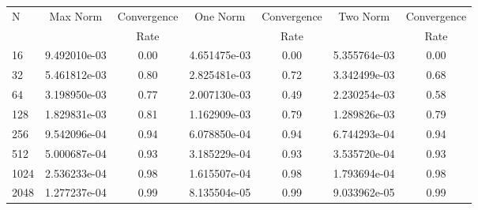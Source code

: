 \documentclass[12pt]{article}
\begin{document}
	\begin{tabular}{l|c|c|c|c|c|c}
		N&Max Norm&Convergence&One Norm&Convergence&Two Norm&Convergence\\
		&&Rate&&Rate&&Rate\\
		\hline
		16&9.492010e-03&0.00&4.651475e-03&0.00&5.355764e-03&0.00\\
		\hline
		32&5.461812e-03&0.80&2.825481e-03&0.72&3.342499e-03&0.68\\
		\hline
		64&3.198950e-03&0.77&2.007130e-03&0.49&2.230254e-03&0.58\\
		\hline
		128&1.829831e-03&0.81&1.162909e-03&0.79&1.289826e-03&0.79\\
		\hline
		256&9.542096e-04&0.94&6.078850e-04&0.94&6.744293e-04&0.94\\
		\hline
		512&5.000687e-04&0.93&3.185229e-04&0.93&3.535720e-04&0.93\\
		\hline
		1024&2.536233e-04&0.98&1.615507e-04&0.98&1.793694e-04&0.98\\
		\hline
		2048&1.277237e-04&0.99&8.135504e-05&0.99&9.033962e-05&0.99\\
	\end{tabular}
\end{document}
